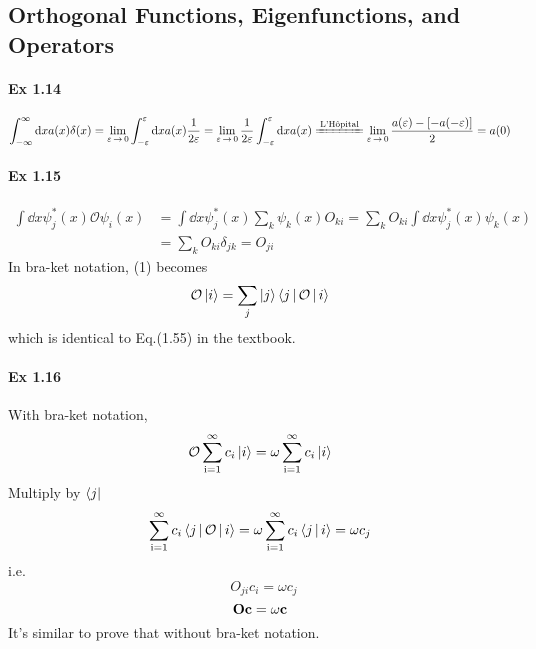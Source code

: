 \documentclass[a4paper]{article}
\DeclareMathOperator{\intdinf}{\int_{-\infty}^\infty}
\DeclareMathOperator{\sumiinf}{\sum_{i=1}^{\infty}}
\DeclareMathOperator{\ra}{\rightarrow}
\newcommand{\ex}[1]{\paragraph{Ex #1}}
\numberwithin{equation}{subsection}
\begin{document}
\subsection{Orthogonal Functions, Eigenfunctions, and Operators}
\ex{1.14}
\begin{equation}\label{key}
\intdinf \dd x a(x)\delta(x) = \lim_{\varepsilon\ra 0} \int_{-\varepsilon}^\varepsilon \dd x a(x)\dfrac{1}{2\varepsilon} = \lim_{\varepsilon\ra 0} \dfrac{1}{2\varepsilon} \int_{-\varepsilon}^\varepsilon \dd x a(x) 
\xlongequal{\text{L'H\^opital}} \lim_{\varepsilon\ra 0} \dfrac{a(\varepsilon) - [-a(-\varepsilon)]}{2} = a(0)
\end{equation}
\ex{1.15}
\begin{equation}\label{key}
\begin{aligned}
\int \dd x \psi_j^*(x)\mathcal{O}\psi_i(x) &= \int\dd x \psi_j^*(x)\sum_k\psi_k(x)O_{ki} = \sum_k O_{ki}\int\dd x \psi_j^*(x)\psi_k(x)\\
&= \sum_k O_{ki}\delta_{jk} =  O_{ji}
\end{aligned}
\end{equation}
In bra-ket notation, (1) becomes
\begin{equation}\label{key}
\mathcal{O}\ket{i} = \sum_j \ket{j} \Braket{j | \mathcal{O} | i}
\end{equation}
which is identical to Eq.(1.55) in the textbook.
\ex{1.16}
With bra-ket notation,
\begin{equation}\label{key}
\mathcal{O}\sumiinf c_i\ket{i} = \omega\sumiinf c_i\ket{i}
\end{equation}
Multiply by $ \bra{j} $
\begin{equation}\label{key}
\sumiinf c_i \Braket{j | \mathcal{O} | i} = \omega\sumiinf c_i \Braket{j | i} = \omega c_j
\end{equation}
i.e.
\begin{equation}\label{key}
\sumiinf O_{ji} c_i = \omega c_j
\end{equation}
\begin{equation}\label{key}
\vb{O}\vb{c} = \omega\vb{c}
\end{equation}
It's similar to prove that without bra-ket notation.
\end{document}
